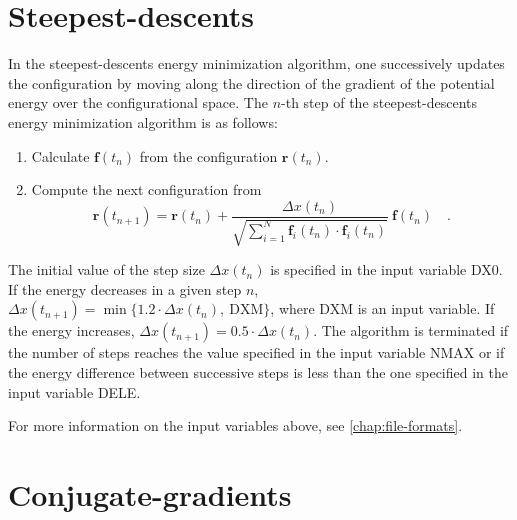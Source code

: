 \documentclass[10pt,a4paper,openany]{memoir}
\numberwithin{equation}{section}
\newcommand{\fsub}[1]{\mathbf{f}_{#1}}
\begin{document}
\section{Steepest-descents}
\label{sec:steep}

In the steepest-descents energy minimization algorithm, one successively updates the configuration by moving along the direction of the gradient of the potential energy over the configurational space.
The $n$-th step of the steepest-descents energy minimization algorithm is as follows: 
\begin{enumerate}
\item Calculate $\mathbf{f}(t_n)$ from the configuration $\mathbf{r}(t_n)$.
\item Compute the next configuration from
  \begin{equation}
    \label{eq:em-steep}
  \mathbf{r}(t_{n+1}) = \mathbf{r}(t_n) + \frac{\Delta x(t_n)}{\sqrt{\sum_{i=1}^N \fsub{i}(t_n)\cdot\fsub{i}(t_n)}}\ \mathbf{f}(t_n) \quad .
  \end{equation}
\end{enumerate}

The initial value of the step size $\Delta x(t_n)$ is specified in the input variable DX0.
If the energy decreases in a given step $n$, $\Delta x(t_{n+1}) = \min{\{1.2\cdot\Delta x(t_{n}),\ \text{DXM}\}}$, where DXM is an input variable.
If the energy increases, $\Delta x(t_{n+1}) = 0.5\cdot\Delta x(t_{n})$.
The algorithm is terminated if the number of steps reaches the value specified in the input variable NMAX or if the energy difference between successive steps is less than the one specified in the input variable DELE.

For more information on the input variables above, see \autoref{chap:file-formats}.

\section{Conjugate-gradients}
\label{sec:conjugate-gradients}
\end{document}
